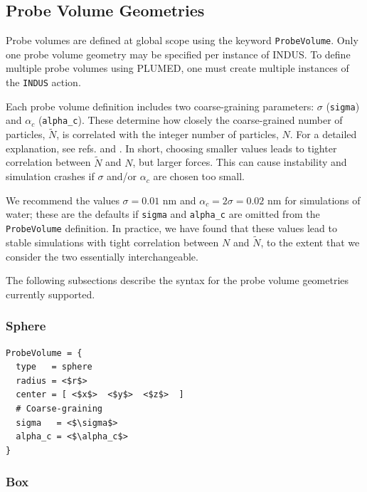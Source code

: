 \documentclass[11pt,notitlepage]{article}
\begin{document}

\subsection{Probe Volume Geometries}

Probe volumes are defined at global scope using the keyword \texttt{ProbeVolume}. Only one probe volume geometry may be specified per instance of INDUS. To define multiple probe volumes using PLUMED, one must create multiple instances of the \texttt{INDUS} action.

Each probe volume definition includes two coarse-graining parameters: $\sigma$
(\texttt{sigma}) and $\alpha_c$ (\texttt{alpha\_c}). These determine how closely the coarse-grained number of particles, $\tilde{N}$, is correlated with the integer number of particles, $N$. For a detailed explanation, see refs. \cite{Patel2010} and \cite{Patel2012}. In short, choosing smaller values leads to tighter correlation between $\tilde{N}$ and $N$, but larger forces. This can cause instability and simulation crashes if $\sigma$ and/or $\alpha_c$ are chosen too small. 

We recommend the values $\sigma = 0.01$ nm and $\alpha_c = 2 \sigma = 0.02$ nm for simulations of water; these are the defaults if \texttt{sigma} and \texttt{alpha\_c} are omitted from the \texttt{ProbeVolume} definition. In practice, we have found that these values lead to stable simulations with tight correlation between $N$ and $\tilde{N}$, to the extent that we consider the two essentially interchangeable.

The following subsections describe the syntax for the probe volume geometries currently supported.


\subsubsection{Sphere}

\begin{lstlisting}
ProbeVolume = {
  type   = sphere
  radius = <$r$>
  center = [ <$x$>  <$y$>  <$z$>  ]
  # Coarse-graining
  sigma   = <$\sigma$>
  alpha_c = <$\alpha_c$>
}
\end{lstlisting}


\subsubsection{Box}
\end{document}
